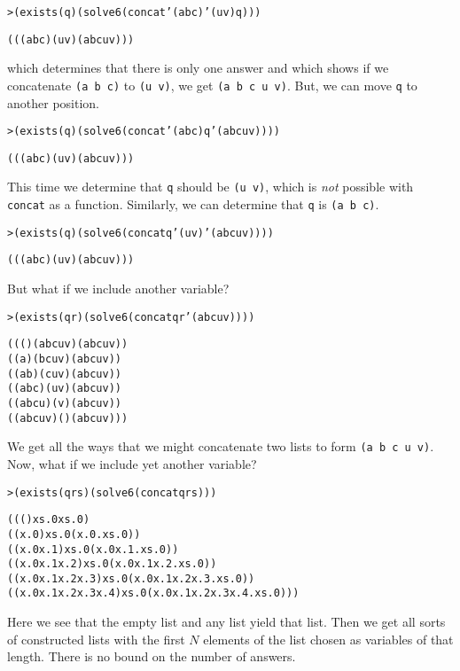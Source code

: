 \begin{alltt}
> (exists (q) (solve 6 (concat '(a b c) '(u v) q)))

(((a b c) (u v) (a b c u v)))
\end{alltt}

\noindent which determines that there is only one answer and which
shows if we concatenate \texttt{(a b c)} to \texttt{(u v)}, we get
\texttt{(a b c u v)}. But, we can move \texttt{q} to another position.

\begin{alltt}
> (exists (q) (solve 6 (concat '(a b c) q '(a b c u v))))

(((a b c) (u v) (a b c u v)))
\end{alltt}

\noindent
This time we determine that \texttt{q} should be \texttt{(u v)}, which
is \emph{not} possible with \texttt{concat} as a function.
Similarly, we can determine that \texttt{q} is \texttt{(a b c)}.

\begin{alltt}
> (exists (q) (solve 6 (concat q '(u v) '(a b c u v))))

(((a b c) (u v) (a b c u v)))
\end{alltt}

\noindent
But what if we include another variable?
\begin{alltt}
> (exists (q r) (solve 6 (concat q r '(a b c u v))))

((() (a b c u v) (a b c u v))
 ((a) (b c u v) (a b c u v))
 ((a b) (c u v) (a b c u v))
 ((a b c) (u v) (a b c u v))
 ((a b c u) (v) (a b c u v))
 ((a b c u v) () (a b c u v)))
\end{alltt}

\noindent
We get all the ways that we might concatenate
two lists to form \texttt{(a b c u v)}.
Now, what if we include yet another variable?

\begin{alltt}
> (exists (q r s) (solve 6 (concat q r s)))

((() xs.0 xs.0)
((x.0) xs.0 (x.0 . xs.0))
((x.0 x.1) xs.0 (x.0 x.1 . xs.0))
((x.0 x.1 x.2) xs.0 (x.0 x.1 x.2 . xs.0))
((x.0 x.1 x.2 x.3) xs.0 (x.0 x.1 x.2 x.3 . xs.0))
((x.0 x.1 x.2 x.3 x.4) xs.0 (x.0 x.1 x.2 x.3 x.4 . xs.0)))
\end{alltt}

\noindent
Here we see that the empty list and any list yield that list.  Then we
get all sorts of constructed lists with the first $N$ elements of the
list chosen as variables of that length.  There is no bound on the
number of answers.  

